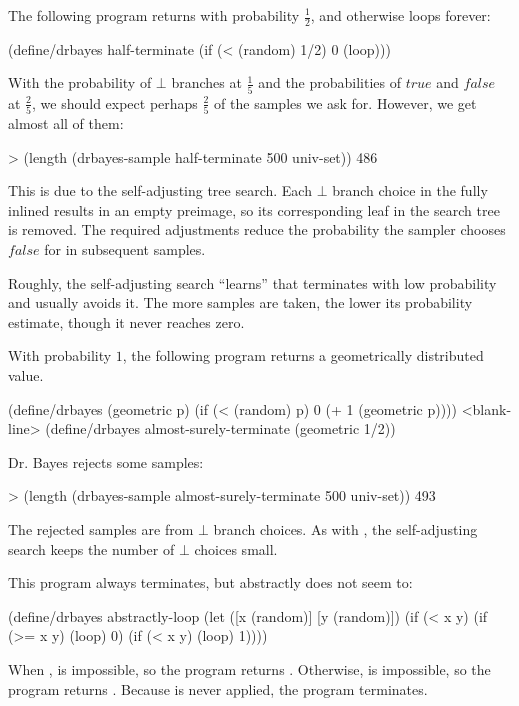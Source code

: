 The following program returns  with probability $\frac{1}{2}$, and otherwise loops forever:
\begin{center}\singlespacing
\begin{schemedisplay}
(define/drbayes half-terminate
  (if (< (random) 1/2) 0 (loop)))
\end{schemedisplay}
\end{center}
With the probability of $\bot$ branches at $\frac{1}{5}$ and the probabilities of $true$ and $false$ at $\frac{2}{5}$, we should expect perhaps $\frac{2}{5}$ of the samples we ask for.
However, we get almost all of them:
\begin{center}\singlespacing
\begin{schemedisplay}
> (length (drbayes-sample half-terminate 500 univ-set))
486
\end{schemedisplay}
\end{center}
This is due to the self-adjusting tree search.
Each $\bot$ branch choice in the fully inlined  results in an empty preimage, so its corresponding leaf in the search tree is removed.
The required adjustments reduce the probability the sampler chooses $false$ for  in subsequent samples.

Roughly, the self-adjusting search ``learns'' that  terminates with low probability and usually avoids it.
The more samples are taken, the lower its probability estimate, though it never reaches zero.

With probability $1$, the following program returns a geometrically distributed value.
\begin{center}\singlespacing
\begin{schemedisplay}
(define/drbayes (geometric p)
  (if (< (random) p) 0 (+ 1 (geometric p))))
<blank-line>
(define/drbayes almost-surely-terminate
  (geometric 1/2))
\end{schemedisplay}
\end{center}
Dr. Bayes rejects some samples:
\begin{center}\singlespacing
\begin{schemedisplay}
> (length (drbayes-sample almost-surely-terminate 500 univ-set))
493
\end{schemedisplay}
\end{center}
The rejected samples are from $\bot$ branch choices.
As with , the self-adjusting search keeps the number of $\bot$ choices small.

This program always terminates, but abstractly does not seem to:
\begin{center}\singlespacing
\begin{schemedisplay}
(define/drbayes abstractly-loop
  (let ([x (random)]
        [y (random)])
    (if (< x y)
        (if (>= x y) (loop) 0)
        (if (< x y) (loop) 1))))
\end{schemedisplay}
\end{center}
When ,  is impossible, so the program returns .
Otherwise,  is impossible, so the program returns .
Because  is never applied, the program terminates.

